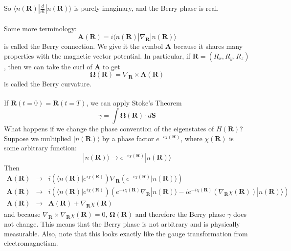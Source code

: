 \documentclass[a4paper,12pt]{article}
\renewcommand{\vec}[1]{\boldsymbol{\mathbf{#1}}}
\begin{document}
So $\langle n(\vec{R}) | \frac{d}{dt} | n(\vec{R}) \rangle$ is purely imaginary, and the Berry phase is real.
\\ \\
Some more terminology:
\begin{equation}
\vec{A}(\vec{R})=i \langle n(\vec{R}) | \nabla_{\vec{R}} | n(\vec{R}) \rangle
\end{equation}
is called the Berry connection.  We give it the symbol $\vec{A}$ because it shares many properties with the magnetic vector potential.  In particular, if $\vec{R} = (R_x, R_y, R_z)$, then we can take the curl of $\vec{A}$ to get
\begin{equation}
\vec{\Omega}(\vec{R}) = \nabla_{\vec{R}} \times \vec{A}(\vec{R})
\end{equation}
is called the Berry curvature.
\\ \\
If $\vec{R}(t=0) = \vec{R}(t=T)$, we can apply Stoke's Theorem
\begin{equation}
\gamma = \int \vec{\Omega}(\vec{R}) \cdot d\vec{S}
\end{equation}
What happens if we change the phase convention of the eigenstates of $H(\vec{R})$?  Suppose we multiplied $| n(\vec{R}) \rangle$ by a phase factor $e^{-i\chi(\vec{R})}$, where $\chi(\vec{R})$ is some arbitrary function:
\begin{equation}
| n(\vec{R}) \rangle \rightarrow e^{-i\chi(\vec{R})} | n(\vec{R}) \rangle
\end{equation}
Then
\begin{eqnarray}
\vec{A}(\vec{R}) &\rightarrow& i \left( \langle n(\vec{R}) | e^{i\chi(\vec{R})} \right) \nabla_{\vec{R}} \left( e^{-i\chi(\vec{R})} | n(\vec{R}) \rangle \right) \\
\vec{A}(\vec{R}) &\rightarrow& i \left( \langle n(\vec{R}) | e^{i\chi(\vec{R})} \right) \left( e^{-i\chi(\vec{R})} \nabla_{\vec{R}} | n(\vec{R}) \rangle -ie^{-i\chi(\vec{R})} \left( \nabla_{\vec{R}} \chi(\vec{R}) \right) | n(\vec{R}) \rangle \right) \\
\vec{A}(\vec{R}) &\rightarrow& \vec{A}(\vec{R}) + \nabla_{\vec{R}} \chi(\vec{R})
\end{eqnarray}
and because $\nabla_{\vec{R}} \times \nabla_{\vec{R}} \chi(\vec{R}) = 0$, $\vec{\Omega(\vec{R})}$ and therefore the Berry phase $\gamma$ does not change.  This means that the Berry phase is not arbitrary and is physically measurable.  Also, note that this looks exactly like the gauge transformation from electromagnetism. \\
\end{document}

